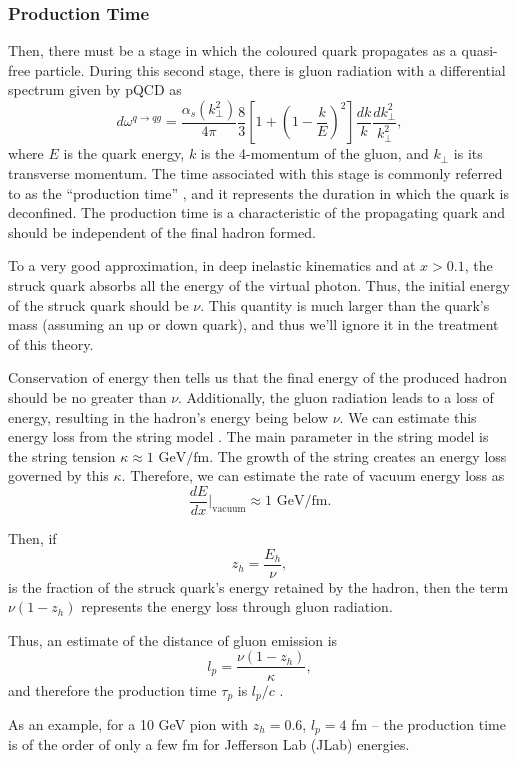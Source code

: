\subsubsection{Production Time}
\label{10.32::production_time}
    Then, there must be a stage in which the coloured quark propagates as a quasi-free particle.
    During this second stage, there is gluon radiation with a differential spectrum given by pQCD as
    \begin{equation*}
        d\omega^{q \rightarrow qg} =
            \frac{\alpha_s(k_\perp^2)}{4\pi}
            \frac{8}{3}\left[ 1 + \left( 1 - \frac{k}{E} \right)^2 \right]
            \frac{dk}{k} \frac{dk_\perp^2}{k_\perp^2},
    \end{equation*}
    where $E$ is the quark energy, $k$ is the 4-momentum of the gluon, and $k_\perp$ is its transverse momentum.
    The time associated with this stage is commonly referred to as the ``production time'' \cite{kopeliovich2004}, and it represents the duration in which the quark is deconfined.
    The production time is a characteristic of the propagating quark and should be independent of the final hadron formed.

    To a very good approximation, in deep inelastic kinematics and at $x > 0.1$, the struck quark absorbs all the energy of the virtual photon.
    Thus, the initial energy of the struck quark should be $\nu$.
    This quantity is much larger than the quark's mass (assuming an up or down quark), and thus we'll ignore it in the treatment of this theory.

    Conservation of energy then tells us that the final energy of the produced hadron should be no greater than $\nu$.
    Additionally, the gluon radiation leads to a loss of energy, resulting in the hadron's energy being below $\nu$.
    We can estimate this energy loss from the string model \cite{artru1974}.
    The main parameter in the string model is the string tension $\kappa \approx 1 \text{ GeV}/\text{fm}$.
    The growth of the string creates an energy loss governed by this $\kappa$.
    Therefore, we can estimate the rate of vacuum energy loss as
    \begin{equation*}
        \frac{dE}{dx}\Big|_\text{vacuum} \approx 1 \text{ GeV}/\text{fm}.
    \end{equation*}

    Then, if
    \begin{equation}
        z_h = \frac{E_h}{\nu},
        \label{eq::10.32::zh}
    \end{equation}
    is the fraction of the struck quark's energy retained by the hadron, then the term $\nu(1 - z_h)$ represents the energy loss through gluon radiation.

    Thus, an estimate of the distance of gluon emission is
    \begin{equation*}
        l_p = \frac{\nu(1 - z_h)}{\kappa},
    \end{equation*}
    and therefore the production time $\tau_p$ is $l_p/c$ \cite{kopeliovich2004}.

    As an example, for a 10 GeV pion with $z_h = 0.6$, $l_p = 4$ fm -- the production time is of the order of only a few fm for Jefferson Lab (JLab) energies.
